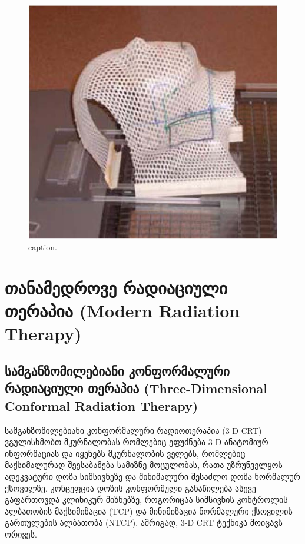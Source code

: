 \documentclass[12pt,a4paper,]{report}
\begin{document}
	\begin{figure}[!h]
	    \centering
        \includegraphics[width = 15cm]{images/ptpaid_02}
        \caption{caption.}
    \end{figure}

\chapter{თანამედროვე რადიაციული თერაპია (Modern Radiation Therapy)}
\section{სამგანზომილებიანი კონფორმალური რადიაციული თერაპია (Three-Dimensional Conformal Radiation Therapy)}
სამგანზომილებიანი კონფორმალური რადიოთერაპია (3-D CRT) ვგულისხმობთ მკურნალობას რომლებიც ეფუძნება 3-D ანატომიურ ინფორმაციას და იყენებს მკურნალობის ველებს, რომლებიც მაქსიმალურად შეესაბამება სამიზნე მოცულობას, რათა უზრუნველყოს ადეკვატური დოზა სიმსივნეზე და მინიმალური შესაძლო დოზა ნორმალურ ქსოვილზე. კონცეფცია დოზის კონფორმული განაწილება ასევე გაფართოვდა კლინიკურ მიზნებზე, როგორიცაა სიმსივნის კონტროლის ალბათობის მაქსიმიზაცია (TCP) და მინიმიზაცია ნორმალური ქსოვილის გართულების ალბათობა (NTCP). ამრიგად, 3-D CRT ტექნიკა მოიცავს ორივეს.
\end{document}
